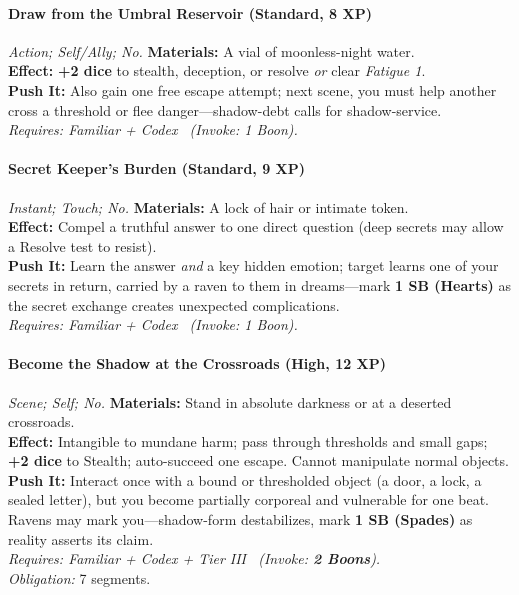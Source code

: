 \paragraph{Draw from the Umbral Reservoir (Standard, 8 XP)} \emph{Action; Self/Ally; No.}
\textbf{Materials:} A vial of moonless-night water.\\
\textbf{Effect:} \textbf{+2 dice} to stealth, deception, or resolve \emph{or} clear \emph{Fatigue 1}.\\
\textbf{Push It:} Also gain one free escape attempt; next scene, you must help another cross a threshold or flee danger—shadow-debt calls for shadow-service.\\
\emph{Requires: Familiar + Codex \ (\textit{Invoke:} 1 Boon).}

\paragraph{Secret Keeper's Burden (Standard, 9 XP)} \emph{Instant; Touch; No.}
\textbf{Materials:} A lock of hair or intimate token.\\
\textbf{Effect:} Compel a truthful answer to one direct question (deep secrets may allow a Resolve test to resist).\\
\textbf{Push It:} Learn the answer \emph{and} a key hidden emotion; target learns one of your secrets in return, carried by a raven to them in dreams—mark \textbf{1 SB (Hearts)} as the secret exchange creates unexpected complications.\\
\emph{Requires: Familiar + Codex \ (\textit{Invoke:} 1 Boon).}

\paragraph{Become the Shadow at the Crossroads (High, 12 XP)} \emph{Scene; Self; No.}
\textbf{Materials:} Stand in absolute darkness or at a deserted crossroads.\\
\textbf{Effect:} Intangible to mundane harm; pass through thresholds and small gaps; \textbf{+2 dice} to Stealth; auto-succeed one escape. Cannot manipulate normal objects.\\
\textbf{Push It:} Interact once with a bound or thresholded object (a door, a lock, a sealed letter), but you become partially corporeal and vulnerable for one beat. Ravens may mark you—shadow-form destabilizes, mark \textbf{1 SB (Spades)} as reality asserts its claim.\\
\emph{Requires: Familiar + Codex + Tier III \ (\textit{Invoke:} \textbf{2 Boons}).}\\
\emph{Obligation:} 7 segments.